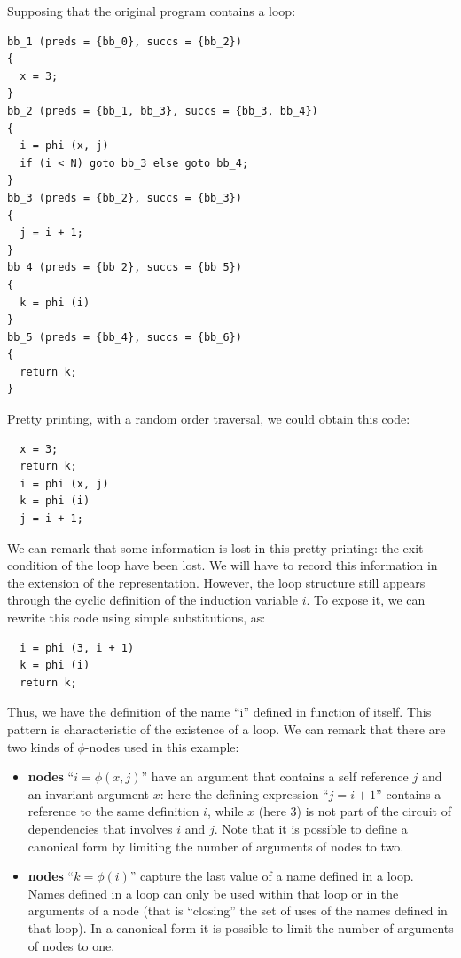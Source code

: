 Supposing that the original program contains a loop:
\begin{verbatim}
bb_1 (preds = {bb_0}, succs = {bb_2})
{
  x = 3;
}
bb_2 (preds = {bb_1, bb_3}, succs = {bb_3, bb_4})
{
  i = phi (x, j)
  if (i < N) goto bb_3 else goto bb_4;
}
bb_3 (preds = {bb_2}, succs = {bb_3})
{
  j = i + 1;
}
bb_4 (preds = {bb_2}, succs = {bb_5})
{
  k = phi (i)
}
bb_5 (preds = {bb_4}, succs = {bb_6})
{
  return k;
}
\end{verbatim}
Pretty printing, with a random order traversal, we could obtain this
\SSA{} code:
\begin{verbatim}
  x = 3;
  return k;
  i = phi (x, j)
  k = phi (i)
  j = i + 1;
\end{verbatim}
We can remark that some information is lost in this pretty printing:
the exit condition of the loop have been lost. We will have to record
this information in the extension of the \SSA{} representation. However, the
loop structure still appears through the cyclic definition of the induction variable $i$. To expose it, we can rewrite this
\SSA{} code using simple substitutions, as:
\begin{verbatim}
  i = phi (3, i + 1)
  k = phi (i)
  return k;
\end{verbatim}
Thus, we have the definition of the \SSA{} name ``i'' defined in
function of itself.  This pattern is characteristic of the existence
of a loop.  We can remark that there are two kinds of $\phi$-nodes used in this example:
\begin{itemize}
\item {\bf \loopphi{} nodes}  ``$i = \phi (x, j)$'' have an argument that contains a self reference $j$ and an invariant argument
  $x$: here the defining expression ``$j = i + 1$'' contains a reference to
  the same \loopphi{} definition $i$, while $x$ (here $3$) is not part of the circuit of dependencies that involves $i$ and $j$. Note that it is possible to define a
  canonical \SSA{} form by limiting the number of arguments of
  \loopphi{} nodes to two.
\item {\bf \closephi{} nodes} ``$k = \phi (i)$''  capture the last value of a name defined
  in a loop.  Names defined in a loop can only be used within that
  loop or in the arguments of a \closephi{} node (that is ``closing''
  the set of uses of the names defined in that loop).  In a canonical
  \SSA{} form it is possible to limit the number of arguments of
  \closephi{} nodes to one.
\end{itemize}

